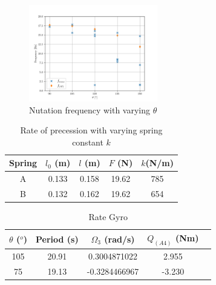 \documentclass[8pt]{article}
\begin{document}
\begin{figure}[H]
    \centering
    \includegraphics[width=0.5\textwidth]{nutation.png}
    \caption{Nutation frequency with varying $\theta$}
    \label{fig:nutation}
\end{figure}


\begin{table}[H]
    \centering
    \begin{tabular}{|c|c|c|c|c|}
        \hline
        Spring & $l_0$ (m) & $l$ (m) & $F$ (N) & $k$(N/m)\\
        \hline
        A	& 0.133	& 0.158	& 19.62	& 785 \\
        B	& 0.132	& 0.162	& 19.62	& 654 \\
        \hline
    \end{tabular}
    \caption{Rate of precession with varying spring constant $k$}
    \label{tab:springs}
\end{table}

\begin{table}[H]
    \centering
    \begin{tabular}{|c|c|c|c|c|}
        \hline
        $\theta$ ($^o$) & Period (s) & $\Omega_3$ (rad/s) &  $Q_{(A4)}$ (Nm)\\
        \hline
        105	& 20.91	& 0.3004871022  &	2.955 \\
        75	& 19.13	& -0.3284466967	&   -3.230 \\
        \hline
    \end{tabular}
    \caption{Rate Gyro}
    \label{tab:precession_vs_k}
\end{table}

\end{document}
